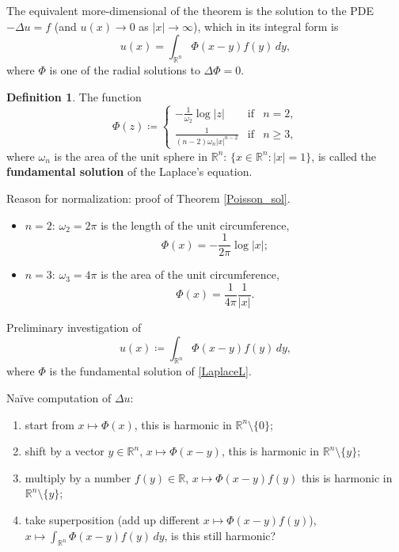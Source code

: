 \documentclass[12pt]{article}
\theoremstyle{definition}
\newtheorem*{definition*}{Definition}
\begin{document}
The equivalent more-dimensional of the theorem is the solution to the PDE $-\Delta u=f$ (and $u(x)\rightarrow0$ as $|x|\to\infty$), which in its integral form is
\[u(x)=\int_{\mathbb R^n}\Phi(x-y)f(y)\,dy,\]
where $\Phi$ is one of the radial solutions to $\Delta\Phi=0$.

\begin{definition*}
The function
\[\Phi(z)\coloneqq\left\{\begin{array}{lll}\displaystyle{-\frac1{\omega_2}\log|z|}&\text{if}&n=2,\\\displaystyle{\frac1{(n-2)\omega_n|x|^{n-2}}}&\text{if}&n\geq3,\end{array}\right.\]
where $\omega_n$ is the area of the unit sphere in $\mathbb R^n$: $\{x\in\mathbb R^n:|x|=1\}$, is called the \textbf{fundamental solution} of the Laplace's equation.

Reason for normalization: proof of Theorem \ref{Poisson_sol}.
\end{definition*}

\begin{itemize}
\item $n=2$: $\omega_2=2\pi$ is the length of the unit circumference,
\[\Phi(x)=-\frac1{2\pi}\log|x|;\]
\item $n=3$: $\omega_3=4\pi$ is the area of the unit circumference,
\[\Phi(x)=\frac1{4\pi}\frac1{|x|}.\]
\end{itemize}

Preliminary investigation of
\begin{equation}\tag{1}\label{definition_u}
u(x)\coloneqq\int_{\mathbb R^n}\Phi(x-y)f(y)\,dy,
\end{equation}
where $\Phi$ is the fundamental solution of \eqref{LaplaceL}.

Na\"ive computation of $\Delta u$:
\begin{enumerate}[label=(\roman*)]
\item start from $x\mapsto\Phi(x)$, this is harmonic in $\mathbb R^n\setminus\{0\}$;
\item shift by a vector $y\in\mathbb R^n$, $x\mapsto\Phi(x-y)$, this is harmonic in $\mathbb R^n\setminus\{y\}$;
\item multiply by a number $f(y)\in\mathbb R$, $x\mapsto\Phi(x-y)f(y)$ this is harmonic in $\mathbb R^n\setminus\{y\}$;
\item take superposition (add up different $x\mapsto\Phi(x-y)f(y)$), $x\mapsto\int_{\mathbb R^n}\Phi(x-y)f(y)\,dy$, is this still harmonic?
\end{enumerate}
\end{document}

